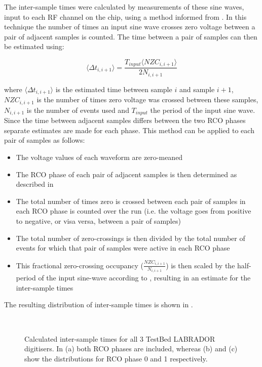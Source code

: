 The inter-sample times were calculated by measurements of these sine waves, input to each RF channel on the chip, using a method informed from \cite{AbbyThesis}. In this technique the number of times an input sine wave crosses zero voltage between a pair of adjacent samples is counted. The time between a pair of samples can then be estimated using:

\begin{equation}
  \langle \Delta t_{i,i+1} \rangle = \frac{T_{input} \langle NZC_{i,i+1} \rangle}{2 N_{i,i+1}}
  \label{eq:calibration:inter-sample-times}
\end{equation}

where $\langle \Delta t_{i,i+1} \rangle$ is the estimated time between sample $i$ and sample $i+1$, $NZC_{i,i+1}$ is the number of times zero voltage was crossed between these samples, $N_{i,i+1}$ is the number of events used and $T_{input}$ the period of the input sine wave. Since the time between adjacent samples differs between the two RCO phases separate estimates are made for each phase. This method can be applied to each pair of samples as follows:

\begin{itemize}
\item The voltage values of each waveform are zero-meaned 
\item The RCO phase of each pair of adjacent samples is then determined as described in 
\item The total number of times zero is crossed between each pair of samples in each RCO phase is counted over the run (i.e. the voltage goes from positive to negative, or visa versa, between a pair of samples)
\item The total number of zero-crossings is then divided by the total number of events for which that pair of samples were active in each RCO phase
\item This fractional zero-crossing occupancy ($\frac{NZC_{i,i+1}}{N_{i,i+1}}$) is then scaled by the half-period of the input sine-wave according to , resulting in an estimate for the inter-sample times
\end{itemize}


The resulting distribution of inter-sample times is shown in . 

\begin{figure}[htpb]
  \\
  \hfill
  \caption{Calculated inter-sample times for all 3 TestBed LABRADOR digitisers. In (a) both RCO phases are included, whereas (b) and (c) show the distributions for RCO phase 0 and 1 respectively.}
  \label{fig:calibration:LABRADOR-Digitiser-Chip:Inter-sample-times}
\end{figure}

